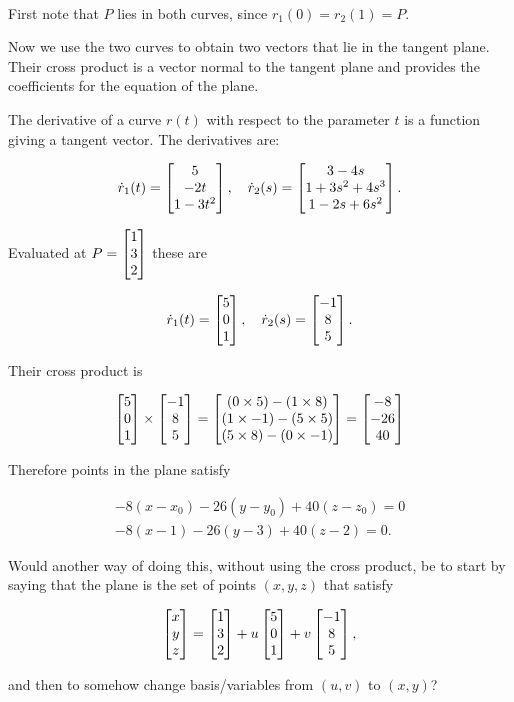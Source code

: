 \documentclass[12pt]{article}
\begin{document}
~\\\begin{mdframed}
First note that $P$ lies in both curves, since $r_1(0) = r_2(1) = P$.

Now we use the two curves to obtain two vectors that lie in the tangent
plane. Their cross product is a vector normal to the tangent plane and provides
the coefficients for the equation of the plane.

The derivative of a curve $r(t)$ with respect to the parameter $t$ is a
function giving a tangent vector. The derivatives are:

\begin{align*}
  \dot r_1(t) = \begin{bmatrix}5\\-2t\\1 - 3t^2\end{bmatrix}, ~~~
  \dot r_2(s) = \begin{bmatrix}3 - 4s\\1 + 3s^2 + 4s^3\\1 - 2s + 6s^2\end{bmatrix}.
\end{align*}

Evaluated at $P = \begin{bmatrix}1\\3\\2\end{bmatrix}$ these are

\begin{align*}
  \dot r_1(t) = \begin{bmatrix}5\\0\\1\end{bmatrix}, ~~~
  \dot r_2(s) = \begin{bmatrix}-1\\8\\5\end{bmatrix}.
\end{align*}

Their cross product is

\begin{align*}
  \begin{bmatrix}5\\0\\1\end{bmatrix} \times \begin{bmatrix}-1\\8\\5\end{bmatrix} =
  \begin{bmatrix}(0 \times 5) - (1 \times 8)\\(1 \times -1) - (5 \times 5)\\(5 \times 8) - (0 \times -1)\end{bmatrix} =
  \begin{bmatrix}-8\\-26\\40\end{bmatrix}
\end{align*}


Therefore points in the plane satisfy

\begin{align*}
  -8(x - x_0) - 26(y - y_0) + 40(z - z_0) = 0 \\
  -8(x - 1)   - 26(y - 3)   + 40(z - 2) = 0.
\end{align*}

Would another way of doing this, without using the cross product, be to start
by saying that the plane is the set of points $(x, y, z)$ that satisfy

\begin{align*}
  \begin{bmatrix}x\\y\\z\end{bmatrix} = \begin{bmatrix}1\\3\\2\end{bmatrix} + u\begin{bmatrix}5\\0\\1\end{bmatrix} + v \begin{bmatrix}-1\\8\\5\end{bmatrix},
\end{align*}

and then to somehow change basis/variables from $(u, v)$ to $(x, y)$?

\end{mdframed}
\end{document}
